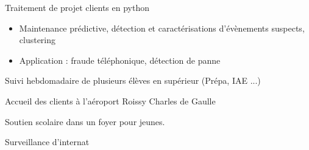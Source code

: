 \documentclass[10pt,a4paper]{fonteCV}
\begin{document}
\divider

Traitement de projet clients en python
\smallskip
\begin{itemize}
\item Maintenance prédictive, détection et caractérisations d'évènements suspects, clustering
\item Application : fraude téléphonique, détection de panne
\end{itemize}
\vspace{0.25cm}


   Suivi hebdomadaire de plusieurs élèves en supérieur (Prépa, IAE ...) 

\vspace{0.25cm}


   Accueil des clients à l'aéroport Roissy Charles de Gaulle

\vspace{0.25cm}

Soutien scolaire dans un foyer pour jeunes.

\vspace{0.25cm}

 Surveillance d'internat
\end{document}
